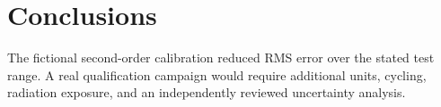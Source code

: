 \chapter{Conclusions}
The fictional second-order calibration reduced RMS error over the stated test
range. A real qualification campaign would require additional units, cycling,
radiation exposure, and an independently reviewed uncertainty analysis.

